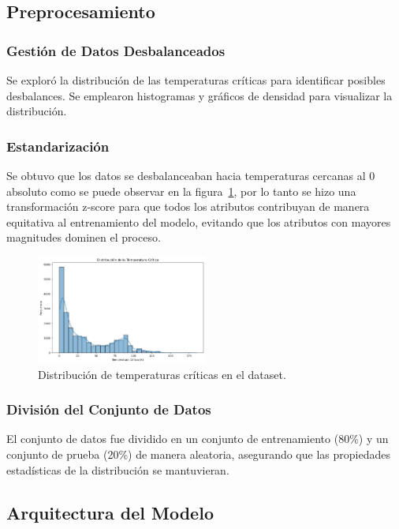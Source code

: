\documentclass[conference]{IEEEtran} %
\begin{document}
\subsection{Preprocesamiento}

\subsubsection{Gestión de Datos Desbalanceados} Se exploró la distribución de 
las temperaturas críticas para identificar posibles desbalances. 
Se emplearon histogramas y gráficos de densidad para visualizar 
la distribución.

\subsubsection{Estandarizaci\'on}
Se obtuvo que los datos se desbalanceaban hacia temperaturas 
cercanas al 0 absoluto como se puede observar en la figura~\ref{fig:desvalance}, por lo tanto se hizo una transformación 
z-score para que todos los atributos contribuyan de manera 
equitativa al entrenamiento del modelo, evitando que los atributos 
con mayores magnitudes dominen el proceso.

\begin{figure}[!h]
    \centering
    \includegraphics[width=0.5\textwidth]{Desvalance.png}
    \caption{Distribución de temperaturas críticas en el dataset.}
    \label{fig:desvalance}
\end{figure}

\subsubsection{División del Conjunto de Datos}
El conjunto de datos fue dividido 
en un conjunto de entrenamiento (80\%) y un conjunto de prueba 
(20\%) de manera aleatoria, asegurando que las propiedades 
estadísticas de la distribución se mantuvieran.

\subsection{Arquitectura del Modelo}
\end{document}
